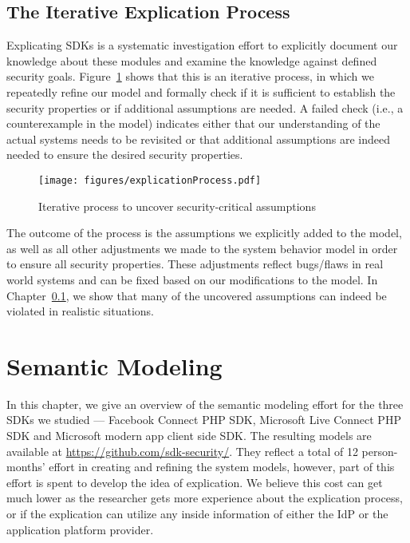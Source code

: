 \subsection{The Iterative Explication Process}

Explicating SDKs is a systematic investigation effort to explicitly document our knowledge about these modules and examine the knowledge against defined security goals.  Figure~\ref{fig:iterativeprocess} shows that this is an iterative process, in which we repeatedly refine our model and formally check if it is sufficient to establish the security properties or if additional assumptions are needed.  A failed check (i.e., a counterexample in the model) indicates either that our understanding of the actual systems needs to be revisited or that additional assumptions are indeed needed to ensure the desired security properties.  

\begin{figure}[hbt]
\centering
\texttt{[image: figures/explicationProcess.pdf]}
\caption{Iterative process to uncover security-critical assumptions}
\label{fig:iterativeprocess}
\end{figure}

The outcome of the process is the assumptions we explicitly added to the model, as well as all other adjustments we made to the system behavior model in order to ensure all security properties.  These adjustments reflect bugs/flaws in real world systems and can be fixed based on our modifications to the model.  In Chapter~\ref{}, we show that many of the uncovered assumptions can indeed be violated in realistic situations. 

\section{Semantic Modeling}
\label{sec:semantic_modeling}
In this chapter, we give an overview of the semantic modeling effort for the three SDKs we studied --- Facebook Connect PHP SDK, Microsoft Live Connect PHP SDK and Microsoft modern app client side SDK.  The resulting models are available at \url{https://github.com/sdk-security/}. They reflect a total of 12 person-months' effort in creating and refining the system models, however, part of this effort is spent to develop the idea of explication.  We believe this cost can get much lower as the researcher gets more experience about the explication process, or if the explication can utilize any inside information of either the IdP or the application platform provider.

